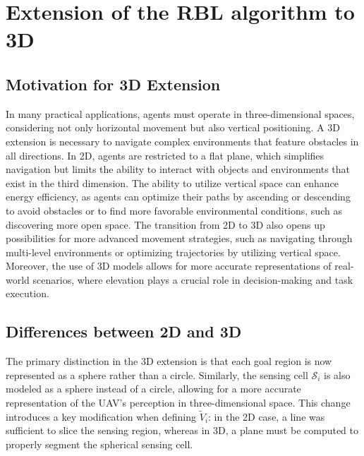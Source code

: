 \section{Extension of the RBL algorithm to 3D}
    \subsection{Motivation for 3D Extension}
        In many practical applications, agents must operate in three-dimensional spaces, considering not only horizontal movement but also vertical positioning.
        A 3D extension is necessary to navigate complex environments that feature obstacles in all directions.
        In 2D, agents are restricted to a flat plane, which simplifies navigation but limits the ability to interact with objects and environments that exist in the third dimension.
        The ability to utilize vertical space can enhance energy efficiency, as agents can optimize their paths by ascending or descending to avoid obstacles or to find more favorable environmental conditions, such as discovering more open space.
        The transition from 2D to 3D also opens up possibilities for more advanced movement strategies, such as navigating through multi-level environments or optimizing trajectories by utilizing vertical space.  
        Moreover, the use of 3D models allows for more accurate representations of real-world scenarios, where elevation plays a crucial role in decision-making and task execution.


    \subsection{Differences between 2D and 3D}
        The primary distinction in the 3D extension is that each goal region is now represented as a sphere rather than a circle.  
        Similarly, the sensing cell $\mathcal{S}_i$ is also modeled as a sphere instead of a circle, allowing for a more accurate representation of the \ac{UAV}'s perception in three-dimensional space.  
        This change introduces a key modification when defining $\tilde{V}_i$: in the 2D case, a line was sufficient to slice the sensing region, whereas in 3D, a plane must be computed to properly segment the spherical sensing cell. 
        

